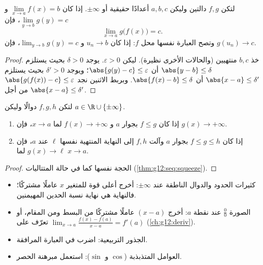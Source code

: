 \begin{theorem}\label{thm:g12:limcont:composition}
لتكن $f, g$ دالتين وليكن $a, b, c$ أعدادًا حقيقية أو $\pm\infty$. إذا كان
$\lim\limits_{x \to a} f(x) = b$ و $\lim\limits_{y \to b} g(y) = c$، فإن
\[
\lim_{x \to a} g\bigl(f(x)\bigr) = c .
\]
وتصح العبارة نفسها  محل $f$: إذا كان
$u_n \to b$ و $\lim_{y\to b} g(y) = c$، فإن $g(u_n) \to c$.
\end{theorem}

\begin{proof}
خذ $b, c$ منتهيين (والحالات الأخرى نظيرة). ليكن $\varepsilon > 0$.
يوجد $\delta > 0$ بحيث يستلزم $\abs{y - b} \leq \delta$ أن
$\abs{g(y) - c} \leq \varepsilon$؛ ويوجد $\delta' > 0$ بحيث يستلزم
$\abs{x - a} \leq \delta'$ أن $\abs{f(x) - b} \leq \delta$. وبربط
الاثنين نجد $\abs{g(f(x)) - c} \leq \varepsilon$ من أجل
$\abs{x - a} \leq \delta'$.
\end{proof}

\begin{theorem}\label{thm:g12:limcont:squeeze}
لتكن $f, g, h$ دوالًا وليكن $a \in \R \cup \{\pm\infty\}$.
\begin{enumerate}
  \item إذا كان $f \leq g$ بجوار $a$ و $f(x) \to +\infty$ لما $x \to a$، فإن
        $g(x) \to +\infty$.
  \item إذا كان $f \leq g \leq h$ بجوار $a$ وآلت $f, h$ إلى النهاية المنتهية
        نفسها $\ell$ عند $a$، فإن $g(x) \to \ell$ لما $x \to a$.
\end{enumerate}
\end{theorem}

\begin{proof}
الحجة نفسها كما في حالة المتتاليات (\cref{thm:g12:seq:squeeze}).
\end{proof}

\begin{method}\label{met:g12:limcont:limits}
\begin{itemize}
  \item كثيرات الحدود والدوال الناطقة عند $\pm\infty$: أخرج أعلى قوة
        للمتغير $x$ عاملًا مشتركًا؛ فالنهاية هي نهاية نسبة الحدين
        المهيمنين.
  \item الصورة $\frac{0}{0}$ عند نقطة $a$: أخرج $(x-a)$ عاملًا مشتركًا من البسط ومن
        المقام، أو تعرّف على 
        $\lim_{x\to a}\frac{f(x)-f(a)}{x-a} = f'(a)$ (\cref{ch:g12:deriv}).
  \item الجذور التربيعية: اضرب في العبارة المرافقة.
  \item العوامل المتذبذبة ($\cos$ و $\sin$): استعمل مبرهنة الحصر.
\end{itemize}
\end{method}

